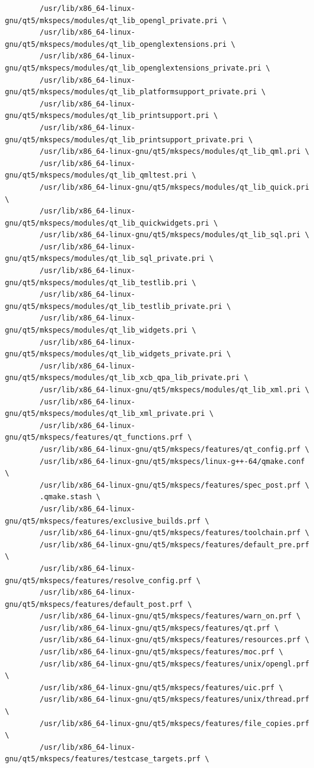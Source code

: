 \documentclass[a4paper]{article}
\begin{document}
\begin{verbatim}
		/usr/lib/x86_64-linux-gnu/qt5/mkspecs/modules/qt_lib_opengl_private.pri \
		/usr/lib/x86_64-linux-gnu/qt5/mkspecs/modules/qt_lib_openglextensions.pri \
		/usr/lib/x86_64-linux-gnu/qt5/mkspecs/modules/qt_lib_openglextensions_private.pri \
		/usr/lib/x86_64-linux-gnu/qt5/mkspecs/modules/qt_lib_platformsupport_private.pri \
		/usr/lib/x86_64-linux-gnu/qt5/mkspecs/modules/qt_lib_printsupport.pri \
		/usr/lib/x86_64-linux-gnu/qt5/mkspecs/modules/qt_lib_printsupport_private.pri \
		/usr/lib/x86_64-linux-gnu/qt5/mkspecs/modules/qt_lib_qml.pri \
		/usr/lib/x86_64-linux-gnu/qt5/mkspecs/modules/qt_lib_qmltest.pri \
		/usr/lib/x86_64-linux-gnu/qt5/mkspecs/modules/qt_lib_quick.pri \
		/usr/lib/x86_64-linux-gnu/qt5/mkspecs/modules/qt_lib_quickwidgets.pri \
		/usr/lib/x86_64-linux-gnu/qt5/mkspecs/modules/qt_lib_sql.pri \
		/usr/lib/x86_64-linux-gnu/qt5/mkspecs/modules/qt_lib_sql_private.pri \
		/usr/lib/x86_64-linux-gnu/qt5/mkspecs/modules/qt_lib_testlib.pri \
		/usr/lib/x86_64-linux-gnu/qt5/mkspecs/modules/qt_lib_testlib_private.pri \
		/usr/lib/x86_64-linux-gnu/qt5/mkspecs/modules/qt_lib_widgets.pri \
		/usr/lib/x86_64-linux-gnu/qt5/mkspecs/modules/qt_lib_widgets_private.pri \
		/usr/lib/x86_64-linux-gnu/qt5/mkspecs/modules/qt_lib_xcb_qpa_lib_private.pri \
		/usr/lib/x86_64-linux-gnu/qt5/mkspecs/modules/qt_lib_xml.pri \
		/usr/lib/x86_64-linux-gnu/qt5/mkspecs/modules/qt_lib_xml_private.pri \
		/usr/lib/x86_64-linux-gnu/qt5/mkspecs/features/qt_functions.prf \
		/usr/lib/x86_64-linux-gnu/qt5/mkspecs/features/qt_config.prf \
		/usr/lib/x86_64-linux-gnu/qt5/mkspecs/linux-g++-64/qmake.conf \
		/usr/lib/x86_64-linux-gnu/qt5/mkspecs/features/spec_post.prf \
		.qmake.stash \
		/usr/lib/x86_64-linux-gnu/qt5/mkspecs/features/exclusive_builds.prf \
		/usr/lib/x86_64-linux-gnu/qt5/mkspecs/features/toolchain.prf \
		/usr/lib/x86_64-linux-gnu/qt5/mkspecs/features/default_pre.prf \
		/usr/lib/x86_64-linux-gnu/qt5/mkspecs/features/resolve_config.prf \
		/usr/lib/x86_64-linux-gnu/qt5/mkspecs/features/default_post.prf \
		/usr/lib/x86_64-linux-gnu/qt5/mkspecs/features/warn_on.prf \
		/usr/lib/x86_64-linux-gnu/qt5/mkspecs/features/qt.prf \
		/usr/lib/x86_64-linux-gnu/qt5/mkspecs/features/resources.prf \
		/usr/lib/x86_64-linux-gnu/qt5/mkspecs/features/moc.prf \
		/usr/lib/x86_64-linux-gnu/qt5/mkspecs/features/unix/opengl.prf \
		/usr/lib/x86_64-linux-gnu/qt5/mkspecs/features/uic.prf \
		/usr/lib/x86_64-linux-gnu/qt5/mkspecs/features/unix/thread.prf \
		/usr/lib/x86_64-linux-gnu/qt5/mkspecs/features/file_copies.prf \
		/usr/lib/x86_64-linux-gnu/qt5/mkspecs/features/testcase_targets.prf \

\end{verbatim}
\end{document}
